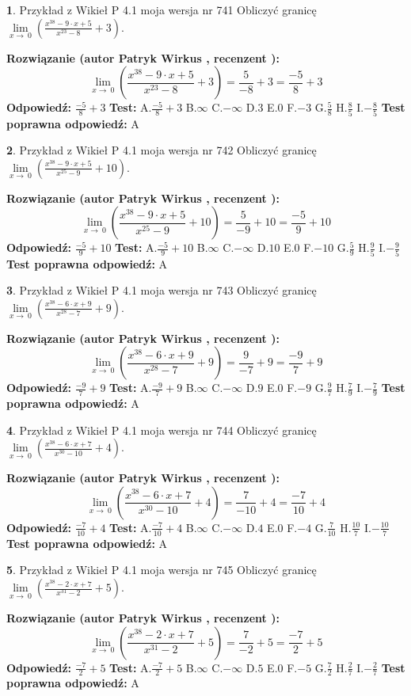\documentclass[12pt, a4paper]{article}
\theoremstyle{definition} %
\newtheorem{zad}{}
\newcommand{\zadStart}[1]{\begin{zad}#1\newline}
\newcommand{\zadStop}{\end{zad}}
\newcommand{\rozwStart}[2]{\noindent \textbf{Rozwiązanie (autor #1 , recenzent #2): }\newline}
\newcommand{\rozwStop}{\newline}
\newcommand{\odpStart}{\noindent \textbf{Odpowiedź:}\newline}
\newcommand{\odpStop}{\newline}
\newcommand{\testStart}{\noindent \textbf{Test:}\newline}
\newcommand{\testStop}{\newline}
\newcommand{\kluczStart}{\noindent \textbf{Test poprawna odpowiedź:}\newline}
\newcommand{\kluczStop}{\newline}
\begin{document}
\zadStart{Przykład z Wikieł P 4.1 moja wersja nr 741}
Obliczyć granicę $\lim\limits_{x\to\ 0}(\frac{x^{38}-9 \cdot x +5}{x^{23}-8}+3)$.
\zadStop
\rozwStart{Patryk Wirkus}{}
$$\lim\limits_{x\to\ 0}(\frac{x^{38}-9 \cdot x +5}{x^{23}-8}+3)=\frac{5}{-8}+3=\frac{-5}{8}+3$$
\rozwStop
\odpStart
$\frac{-5}{8}+3$
\odpStop
\testStart
A.$\frac{-5}{8}+3$
B.$\infty$
C.$-\infty$
D.$3$
E.$0$
F.$-3$
G.$\frac{5}{8}$
H.$\frac{8}{5}$
I.$-\frac{8}{5}$
\testStop
\kluczStart
A
\kluczStop



\zadStart{Przykład z Wikieł P 4.1 moja wersja nr 742}
Obliczyć granicę $\lim\limits_{x\to\ 0}(\frac{x^{38}-9 \cdot x +5}{x^{25}-9}+10)$.
\zadStop
\rozwStart{Patryk Wirkus}{}
$$\lim\limits_{x\to\ 0}(\frac{x^{38}-9 \cdot x +5}{x^{25}-9}+10)=\frac{5}{-9}+10=\frac{-5}{9}+10$$
\rozwStop
\odpStart
$\frac{-5}{9}+10$
\odpStop
\testStart
A.$\frac{-5}{9}+10$
B.$\infty$
C.$-\infty$
D.$10$
E.$0$
F.$-10$
G.$\frac{5}{9}$
H.$\frac{9}{5}$
I.$-\frac{9}{5}$
\testStop
\kluczStart
A
\kluczStop



\zadStart{Przykład z Wikieł P 4.1 moja wersja nr 743}
Obliczyć granicę $\lim\limits_{x\to\ 0}(\frac{x^{38}-6 \cdot x +9}{x^{28}-7}+9)$.
\zadStop
\rozwStart{Patryk Wirkus}{}
$$\lim\limits_{x\to\ 0}(\frac{x^{38}-6 \cdot x +9}{x^{28}-7}+9)=\frac{9}{-7}+9=\frac{-9}{7}+9$$
\rozwStop
\odpStart
$\frac{-9}{7}+9$
\odpStop
\testStart
A.$\frac{-9}{7}+9$
B.$\infty$
C.$-\infty$
D.$9$
E.$0$
F.$-9$
G.$\frac{9}{7}$
H.$\frac{7}{9}$
I.$-\frac{7}{9}$
\testStop
\kluczStart
A
\kluczStop



\zadStart{Przykład z Wikieł P 4.1 moja wersja nr 744}
Obliczyć granicę $\lim\limits_{x\to\ 0}(\frac{x^{38}-6 \cdot x +7}{x^{30}-10}+4)$.
\zadStop
\rozwStart{Patryk Wirkus}{}
$$\lim\limits_{x\to\ 0}(\frac{x^{38}-6 \cdot x +7}{x^{30}-10}+4)=\frac{7}{-10}+4=\frac{-7}{10}+4$$
\rozwStop
\odpStart
$\frac{-7}{10}+4$
\odpStop
\testStart
A.$\frac{-7}{10}+4$
B.$\infty$
C.$-\infty$
D.$4$
E.$0$
F.$-4$
G.$\frac{7}{10}$
H.$\frac{10}{7}$
I.$-\frac{10}{7}$
\testStop
\kluczStart
A
\kluczStop



\zadStart{Przykład z Wikieł P 4.1 moja wersja nr 745}
Obliczyć granicę $\lim\limits_{x\to\ 0}(\frac{x^{38}-2 \cdot x +7}{x^{31}-2}+5)$.
\zadStop
\rozwStart{Patryk Wirkus}{}
$$\lim\limits_{x\to\ 0}(\frac{x^{38}-2 \cdot x +7}{x^{31}-2}+5)=\frac{7}{-2}+5=\frac{-7}{2}+5$$
\rozwStop
\odpStart
$\frac{-7}{2}+5$
\odpStop
\testStart
A.$\frac{-7}{2}+5$
B.$\infty$
C.$-\infty$
D.$5$
E.$0$
F.$-5$
G.$\frac{7}{2}$
H.$\frac{2}{7}$
I.$-\frac{2}{7}$
\testStop
\kluczStart
A
\kluczStop
\end{document}
